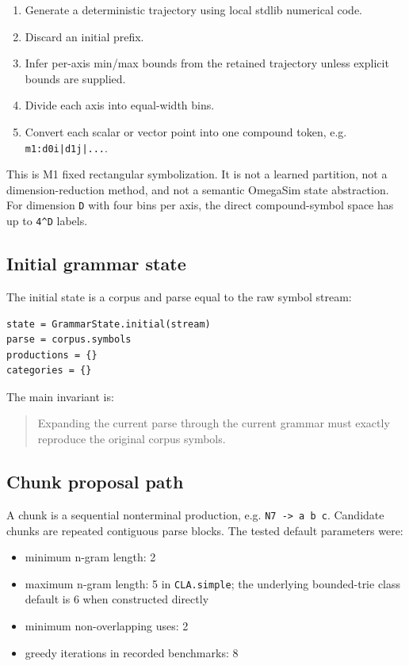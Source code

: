 \documentclass[11pt]{article}
\begin{document}
\begin{enumerate}[leftmargin=*]
\item Generate a deterministic trajectory using local stdlib numerical code.
\item Discard an initial prefix.
\item Infer per-axis min/max bounds from the retained trajectory unless explicit bounds are supplied.
\item Divide each axis into equal-width bins.
\item Convert each scalar or vector point into one compound token, e.g. \texttt{m1:d0i|d1j|...}.
\end{enumerate}

This is M1 fixed rectangular symbolization. It is not a learned partition, not a dimension-reduction method, and not a semantic OmegaSim state abstraction. For dimension \texttt{D} with four bins per axis, the direct compound-symbol space has up to \texttt{4\string^D} labels.

\subsection{Initial grammar state}

The initial state is a corpus and parse equal to the raw symbol stream:

\begin{lstlisting}
state = GrammarState.initial(stream)
parse = corpus.symbols
productions = {}
categories = {}
\end{lstlisting}

The main invariant is:

\begin{quote}
Expanding the current parse through the current grammar must exactly reproduce the original corpus symbols.
\end{quote}

\subsection{Chunk proposal path}

A chunk is a sequential nonterminal production, e.g. \texttt{N7 -> a b c}. Candidate chunks are repeated contiguous parse blocks. The tested default parameters were:

\begin{itemize}[leftmargin=*]
\item minimum n-gram length: 2
\item maximum n-gram length: 5 in \texttt{CLA.simple}; the underlying bounded-trie class default is 6 when constructed directly
\item minimum non-overlapping uses: 2
\item greedy iterations in recorded benchmarks: 8
\end{itemize}
\end{document}
